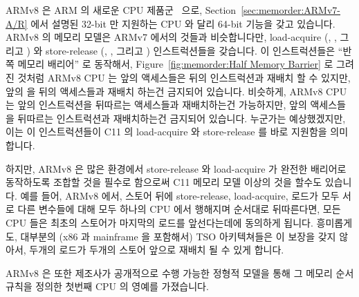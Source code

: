 ARMv8 은 ARM 의 새로운 CPU 제품군~\cite{ARMv8A:2017} 으로,
Section~\ref{sec:memorder:ARMv7-A/R} 에서 설명된 32-bit 만 지원하는 CPU 와 달리
64-bit 기능을 갖고 있습니다.
ARMv8 의 메모리 모델은 ARMv7 에서의 것들과 비슷합니다만, load-acquire
(, , 그리고 ) 와 store-release (,
, 그리고 ) 인스트럭션들을 갖습니다.
이 인스트럭션들은 ``반쪽 메모리 배리어'' 로 동작해서,
Figure~\ref{fig:memorder:Half Memory Barrier} 로 그려진 것처럼 ARMv8 CPU 는
앞의 액세스들은 뒤의  인스트럭션과 재배치 할 수 있지만, 앞의
 을 뒤의 액세스들과 재배치 하는건 금지되어 있습니다.
비슷하게, ARMv8 CPU 는 앞의  인스트럭션을 뒤따르는 액세스들과
재배치하는건 가능하지만, 앞의 액세스들을 뒤따르는  인스트럭션과
재배치하는건 금지되어 있습니다.
누군가는 예상했겠지만, 이는 이 인스트럭션들이 C11 의 load-acquire 와
store-release 를 바로 지원함을 의미합니다.

하지만, ARMv8 은 많은 환경에서 store-release 와 load-acquire 가 완전한 배리어로
동작하도록 조합할 것을 필수로 함으로써 C11 메모리 모델 이상의 것을 할수도
있습니다.
예를 들어, ARMv8 에서, 스토어 뒤에 store-release, load-acquire, 로드가 모두
서로 다른 변수들에 대해 모두 하나의 CPU 에서 행해지며 순서대로 뒤따른다면, 모든
CPU 들은 최초의 스토어가 마지막의 로드를 앞선다는데에 동의하게 됩니다.
흥미롭게도, 대부분의 (x86 과 mainframe 을 포함해서) TSO 아키텍쳐들은 이 보장을
갖지 않아서, 두개의 로드가 두개의 스토어 앞으로 재배치 될 수 있게 합니다.

ARMv8 은 또한 제조사가 공개적으로 수행 가능한 정형적 모델을 통해 그 메모리 순서
규칙을 정의한 첫번째 CPU 의 영예를 가졌습니다.
\iffalse

